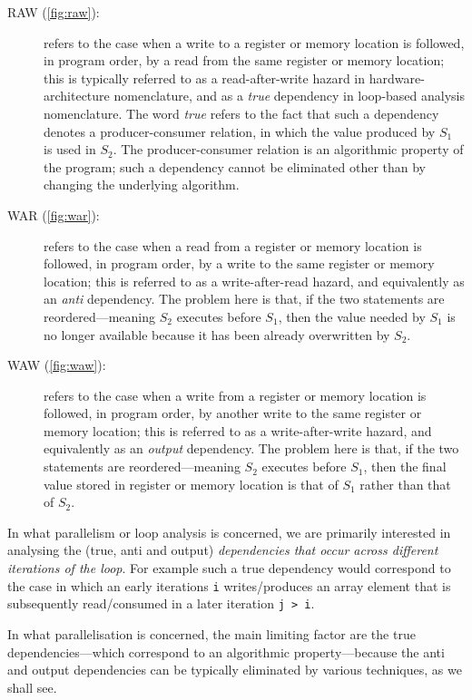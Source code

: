 \begin{description}
\item[RAW (\cref{fig:raw}):] refers to the case when a write to a
  register or memory location is followed, in program order, by a read
  from the same register or memory location; this is typically
  referred to as a read-after-write hazard in hardware-architecture
  nomenclature, and as a \emph{true} dependency in loop-based analysis
  nomenclature. The word \emph{true} refers to the fact that such a
  dependency denotes a producer-consumer relation, in which the value
  produced by $S_{1}$ is used in $S_{2}$. The
  producer-consumer relation is an algorithmic property of the
  program; such a dependency cannot be eliminated other than by
  changing the underlying algorithm.

\item[WAR (\cref{fig:war}):] refers to the case when a read from a
  register or memory location is followed, in program order, by a
  write to the same register or memory location; this is referred to
  as a write-after-read hazard, and equivalently as an \emph{anti}
  dependency. The problem here is that, if the two statements are
  reordered---meaning $S_{2}$ executes before $S_{1}$, then
  the value needed by $S_{1}$ is no longer available because it
  has been already overwritten by $S_{2}$.

\item[WAW (\cref{fig:waw}):] refers to the case when a write from a
  register or memory location is followed, in program order, by
  another write to the same register or memory location; this is
  referred to as a write-after-write hazard, and equivalently as an
  \emph{output} dependency. The problem here is that, if the two
  statements are reordered---meaning $S_{2}$ executes before
  $S_{1}$, then the final value stored in register or memory
  location is that of $S_{1}$ rather than that of $S_{2}$.
\end{description}

In what parallelism or loop analysis is concerned, we are primarily
interested in analysing the (true, anti and output) \emph{dependencies
  that occur across different iterations of the loop}. For example such
a true dependency would correspond to the case in which an early
iterations \texttt{i} writes/produces an array element that is
subsequently read/consumed in a later iteration \texttt{j > i}.

In what parallelisation is concerned, the main limiting factor are the
true dependencies---which correspond to an algorithmic
property---because the anti and output dependencies can be typically
eliminated by various techniques, as we shall see.

